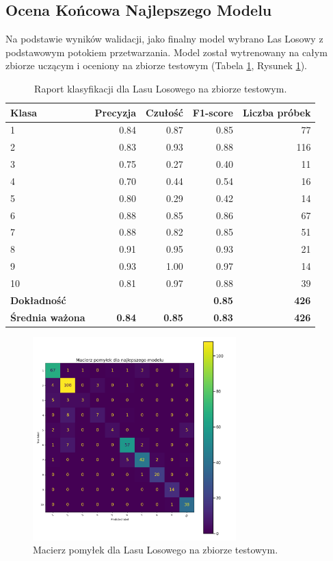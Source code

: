 \documentclass[12pt,a4paper]{article}
\begin{document}
\subsection{Ocena Końcowa Najlepszego Modelu}
Na podstawie wyników walidacji, jako finalny model wybrano Las Losowy z podstawowym potokiem przetwarzania. Model został wytrenowany na całym zbiorze uczącym i oceniony na zbiorze testowym (Tabela \ref{tab:final_report}, Rysunek \ref{fig:final_cm}).

\begin{table}[H]
    \centering
    \caption{Raport klasyfikacji dla Lasu Losowego na zbiorze testowym.}
    \label{tab:final_report}
    \small
    \begin{tabular}{lrrrr}
        \toprule
        \textbf{Klasa} & \textbf{Precyzja} & \textbf{Czułość} & \textbf{F1-score} & \textbf{Liczba próbek} \\
        \midrule
        1 & 0.84 & 0.87 & 0.85 & 77 \\
        2 & 0.83 & 0.93 & 0.88 & 116 \\
        3 & 0.75 & 0.27 & 0.40 & 11 \\
        4 & 0.70 & 0.44 & 0.54 & 16 \\
        5 & 0.80 & 0.29 & 0.42 & 14 \\
        6 & 0.88 & 0.85 & 0.86 & 67 \\
        7 & 0.88 & 0.82 & 0.85 & 51 \\
        8 & 0.91 & 0.95 & 0.93 & 21 \\
        9 & 0.93 & 1.00 & 0.97 & 14 \\
        10 & 0.81 & 0.97 & 0.88 & 39 \\
        \midrule
        \textbf{Dokładność} & & & \textbf{0.85} & \textbf{426} \\
        \textbf{Średnia ważona} & \textbf{0.84} & \textbf{0.85} & \textbf{0.83} & \textbf{426} \\
        \bottomrule
    \end{tabular}
\end{table}
\begin{figure}[H]
    \centering
    \includegraphics[width=0.7\textwidth]{output/best_model_confusion_matrix.png}
    \caption{Macierz pomyłek dla Lasu Losowego na zbiorze testowym.}
    \label{fig:final_cm}
\end{figure}
\end{document}
